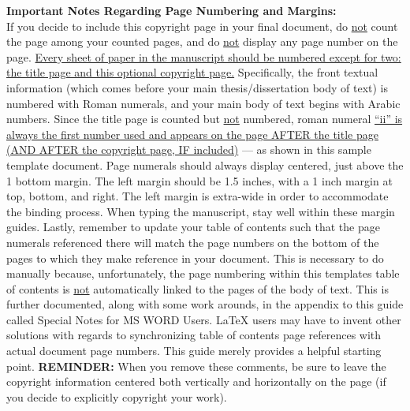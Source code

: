\begin{thesiscopyrightpage}
\begin{singlespace}
{\small \textbf{Important Notes Regarding Page Numbering and Margins:}} \\
If you decide to include this copyright page in your final document, do
\uline{not} count the page among your counted pages, and do \uline{not} display
any page number on the page.  \uline{Every sheet of paper in the manuscript
should be numbered except for two:  the title page and this optional copyright
page.}  Specifically, the front textual information (which comes before your
main thesis/dissertation body of text) is numbered with Roman numerals, and
your main body of text begins with Arabic numbers.  Since the title page is
counted but \uline{not} numbered, roman numeral \uline{``ii'' is always the
first number used and appears on the page AFTER the title page (AND AFTER the
copyright page, IF included)} --- as shown in this sample template document.
Page numerals should always display centered, just above the 1 bottom margin.
The left margin should be 1.5 inches, with a 1 inch margin at top, bottom, and
right.  The left margin is extra-wide in order to accommodate the binding
process.  When typing the manuscript, stay well within these margin guides.
Lastly, remember to update your table of contents such that the page numerals
referenced there will match the page numbers on the bottom of the pages to
which they make reference in your document.  This is necessary to do manually
because, unfortunately, the page numbering within this templates table of
contents is \uline{not} automatically linked to the pages of the body of text.
This is further documented, along with some work arounds, in the appendix to
this guide called Special Notes for MS WORD Users.  \LaTeX{} users may have to
invent other solutions with regards to synchronizing table of contents page
references with actual document page numbers.  This guide merely provides a
helpful starting point.  \textbf{REMINDER:} When you remove these comments, be
sure to leave the copyright information centered both vertically and
horizontally on the page (if you decide to explicitly copyright your work).
\end{singlespace}
\end{thesiscopyrightpage}

